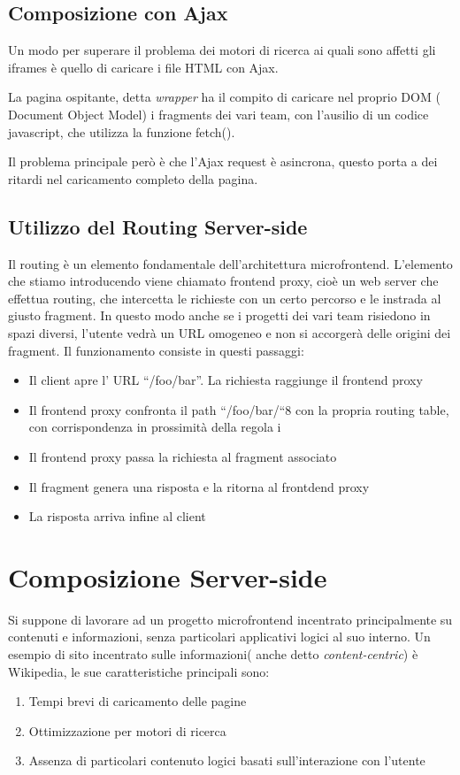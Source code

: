 \subsection*{Composizione con Ajax}
Un modo per superare il problema dei motori di ricerca ai quali sono affetti gli iframes è quello di 
caricare i file HTML con Ajax.

La pagina ospitante, detta \emph{wrapper} ha il compito di caricare nel proprio DOM ( Document Object Model) i fragments dei vari 
team, con l'ausilio di un codice javascript, che utilizza la funzione fetch().

Il problema principale però è che l’Ajax request è asincrona, 
questo porta a dei ritardi nel caricamento completo della pagina.

\subsection*{Utilizzo del Routing Server-side}
Il routing è un elemento fondamentale dell’architettura microfrontend.
L’elemento che stiamo introducendo viene chiamato frontend proxy, cioè un web server che effettua routing,
 che intercetta le richieste con un certo percorso e le instrada al giusto fragment. In questo modo anche se
  i progetti dei vari team risiedono in spazi diversi, l’utente vedrà un URL omogeneo e non si accorgerà delle origini dei fragment.
Il funzionamento consiste in questi passaggi:
\begin{itemize}
    \item Il client apre l’ URL “/foo/bar”. La richiesta raggiunge il frontend proxy
    \item Il frontend proxy confronta il path “/foo/bar/“8 con la propria routing table, con corrispondenza in prossimità della regola i
    \item Il frontend proxy passa la richiesta al fragment associato
    \item Il fragment genera una risposta e la ritorna al frontdend proxy
    \item La risposta arriva infine al client
\end{itemize}


\pagebreak

\section*{Composizione Server-side}
Si suppone di lavorare ad un progetto microfrontend incentrato principalmente su contenuti e informazioni, senza particolari applicativi logici al suo interno.
Un esempio di sito incentrato sulle informazioni( anche detto \emph{content-centric}) è Wikipedia, le sue caratteristiche principali sono:
\begin{enumerate}
    \item Tempi brevi di caricamento delle pagine
    \item Ottimizzazione per motori di ricerca
    \item Assenza di particolari contenuto logici basati sull'interazione con l'utente
\end{enumerate}

